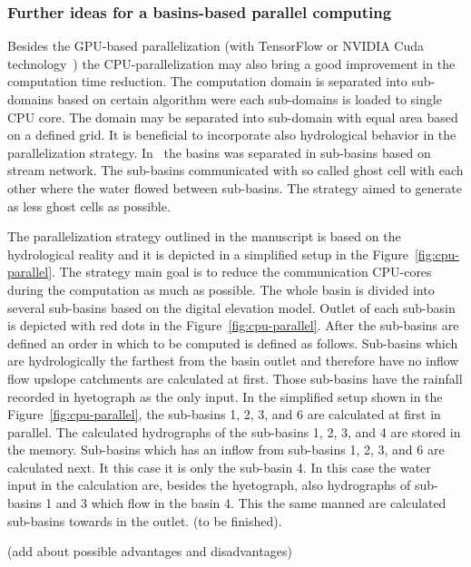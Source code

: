 \subsubsection{Further ideas for a basins-based parallel computing}
Besides the GPU-based parallelization (with TensorFlow \cite{xxx} or
NVIDIA Cuda technology~\cite{Kalyanapu2011,Le2015}) the
CPU-parallelization may also bring a good improvement in the computation
time reduction. The computation domain is separated into sub-domains
based on certain algorithm were each sub-domains is loaded to single
CPU core. The domain may be separated into sub-domain with equal area
based on a defined grid. It is beneficial to incorporate also
hydrological behavior in the parallelization
strategy. In~\cite{Vivoni2011} the basins was separated in sub-basins
based on stream network. The sub-basins communicated with so called
ghost cell with each other where the water flowed between
sub-basins. The strategy aimed to generate as less ghost cells as
possible.

The parallelization strategy outlined in the manuscript is based on
the hydrological reality and it is depicted in a simplified setup in
the Figure~\ref{fig:cpu-parallel}. The strategy main goal is to reduce
the communication CPU-cores during the computation as much as
possible. The whole basin is divided into several sub-basins based on
the digital elevation model. Outlet of each sub-basin is depicted with
red dots in the Figure~\ref{fig:cpu-parallel}. After the sub-basins
are defined an order in which to be computed is defined as
follows. Sub-basins which are hydrologically the farthest from the
basin outlet and therefore have no inflow flow upslope catchments are
calculated at first. Those sub-basins have the rainfall recorded in
hyetograph as the only input. In the simplified setup shown in the
Figure~\ref{fig:cpu-parallel}, the sub-basins 1, 2, 3, and 6 are
calculated at first in parallel. The calculated hydrographs of the
sub-basins 1, 2, 3, and 4 are stored in the memory. Sub-basins which
has an inflow from sub-basins 1, 2, 3, and 6 are calculated next. It
this case it is only the sub-basin 4. In this case the water input in
the calculation are, besides the hyetograph, also hydrographs of
sub-basins 1 and 3 which flow in the basin 4. This the same manned are
calculated sub-basins towards in the outlet. (to be finished).

(add about possible advantages and disadvantages)

